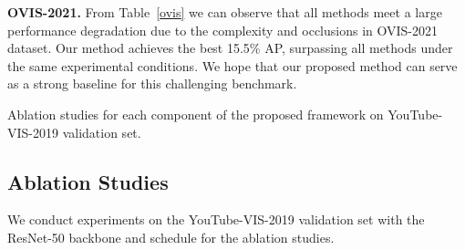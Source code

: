 \documentclass[runningheads]{llncs}
\begin{document}
\noindent \textbf{OVIS-2021.} From Table~\ref{ovis} we can observe that all methods meet a large performance degradation due to the complexity and occlusions in OVIS-2021 dataset. Our method achieves the best 15.5\% AP, surpassing all methods under the same experimental conditions. We hope that our proposed method can serve as a strong baseline for this challenging benchmark.



\begin{table}[t!]
\begin{minipage}{0.46\linewidth}
\caption{Ablation studies for each component of the proposed framework on YouTube-VIS-2019 validation set.}
\centering
{}
\label{modules}
\end{minipage}
\quad
\begin{minipage}{0.46\linewidth}
\caption{Comparisons among different settings of the track embedding on the YouTube-VIS-2019 validation set.}
\centering
{}
\label{tracking}
\end{minipage}
\end{table}



\subsection{Ablation Studies}\label{ablation}
We conduct experiments on the YouTube-VIS-2019 validation set with the ResNet-50 backbone and  schedule for the ablation studies.
\end{document}
